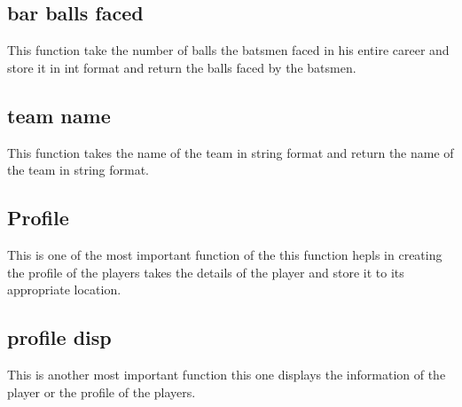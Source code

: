 \documentclass{article}
\begin{document}
\subsection{bar balls faced}
This function take the number of balls the batsmen faced in his entire career and store it in int format and return the balls faced by the batsmen.
\subsection{team name}
This function takes the name of the team in string format and return the name of the team in string format.
\subsection{Profile}
This is one of the most important function of the this function hepls in creating the profile of the players takes the details of the player and store it to its appropriate location.
\subsection{profile disp}
This is another most important function this one displays the information of the player or the profile of the players.
\end{document}
